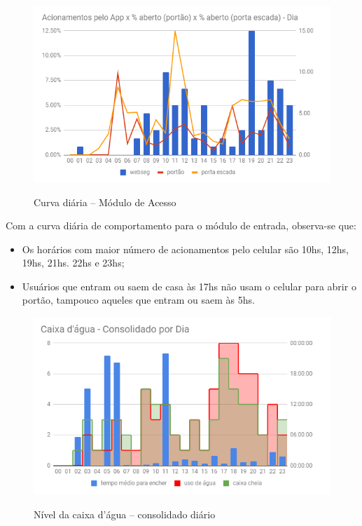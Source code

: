 \begin{figure}[H]
	\centering
	\caption{Curva diária -- Módulo de Acesso}
	\includegraphics[width=1.0\textwidth]{EntradaConsolidadoDia}
	\label{fig:EntradaConsolidadoDia}
\end{figure}

Com a curva diária de comportamento para o módulo de entrada, observa-se que:

\begin{itemize}
	\item Os horários com maior número de acionamentos pelo celular são 10hs, 12hs, 19hs, 21hs. 22hs e 23hs;
	\item Usuários que entram ou saem de casa às 17hs não usam o celular para abrir o portão, tampouco aqueles que entram ou saem às 5hs.
\end{itemize}

\begin{figure}[H]
	\centering
	\caption{Nível da caixa d'água -- consolidado diário}
	\includegraphics[width=1.0\textwidth]{CxAguaDia}
	\label{fig:CxAguaDia}
\end{figure}

